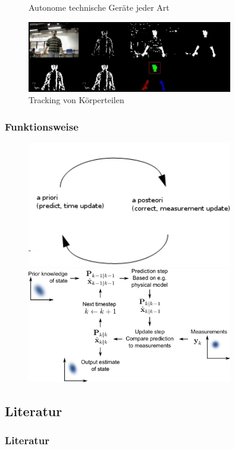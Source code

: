 \documentclass[10pt,a4paper,oneside]{beamer}
\begin{document}
\begin{frame}
\begin{figure}[htbp]
\begin{minipage}{0.3\textwidth}
          \caption{Autonome technische Geräte jeder Art}
        \end{minipage}\hfill
        \begin{minipage}{0.3\textwidth}
         \centering
          \includegraphics[width=0.8\textwidth]{images/head-tracking.jpg}
          \caption{Tracking von Körperteilen}
        \end{minipage}
      \end{figure}
\end{frame}
\begin{frame}
  \frametitle{Funktionsweise}
   \begin{figure}[htbp]
          \begin{minipage}{0.4\textwidth}
           \centering
            \includegraphics[width=0.8\textwidth]{images/grundfunktion.jpg}
          \end{minipage}\hfill
          \begin{minipage}{0.4\textwidth}
           \centering
            \includegraphics[width=0.8\textwidth]{images/Funktionsprinzip.png}
          \end{minipage}\hfill
   \end{figure}
\end{frame}

\begin{frame}
  \section{Literatur}
  \frametitle{Literatur}
\printbibliography

\end{frame}
\end{document}
